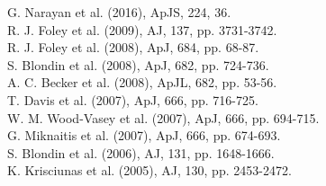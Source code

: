 \documentclass[11pt]{article}
\begin{document}
G. Narayan et al. (2016), ApJS, 224, 36.  \\  %
R. J. Foley et al. (2009), AJ, 137, pp. 3731-3742.  \\  %
R. J. Foley et al. (2008), ApJ, 684, pp. 68-87.  \\  %
S. Blondin et al. (2008), ApJ, 682, pp. 724-736.  \\  %
A. C. Becker et al. (2008), ApJL, 682, pp. 53-56. \\  %
T. Davis et al. (2007), ApJ, 666, pp. 716-725.  \\  %
W. M. Wood-Vasey et al. (2007), ApJ, 666, pp. 694-715. \\  %
G. Miknaitis et al. (2007), ApJ, 666, pp. 674-693. \\  %
S. Blondin et al. (2006), AJ, 131, pp. 1648-1666. \\  %
K. Krisciunas et al. (2005), AJ, 130, pp. 2453-2472. \\  %



%



%
\end{document}
